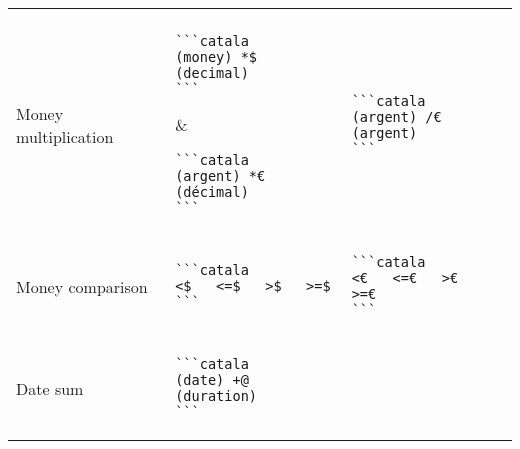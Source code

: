 \documentclass[a3paper,landscape]{article}
\begin{document}
\begin{multicols*}{2}
\begin{center}
\begin{tabular}{p{}p{}p{}}
      \vspace*{-1.75em}
      \\
      Money multiplication            &
      \vspace*{-1.75em}
      \begin{verbatim}
```catala
(money) *$ (decimal)
```
\end{verbatim}
      \vspace*{-1.75em}
                                      &
      \vspace*{-1.75em}
      \begin{verbatim}
```catala
(argent) *€ (décimal)
```
\end{verbatim}
      \vspace*{-1.75em}
      \\
      Money division                  &
      \vspace*{-1.75em}
      \begin{verbatim}
```catala
(money) /$ (money)
```
\end{verbatim}
      \vspace*{-1.75em}
                                      &
      \vspace*{-1.75em}
      \begin{verbatim}
```catala
(argent) /€ (argent)
```
\end{verbatim}
      \vspace*{-1.75em}
      \\
      Money comparison                &
      \vspace*{-1.75em}
      \begin{verbatim}
```catala
<$   <=$   >$   >=$
```
\end{verbatim}
      \vspace*{-1.75em}
                                      &
      \vspace*{-1.75em}
      \begin{verbatim}
```catala
<€   <=€   >€   >=€
```
\end{verbatim}
      \vspace*{-1.75em}
      \\
      Date sum                        &
      \vspace*{-1.75em}
      \begin{verbatim}
```catala
(date) +@ (duration)
```
\end{verbatim}
      \vspace*{-1.75em}
                                      &
      \vspace*{-1.75em}

\end{tabular}
\end{center}
\end{multicols*}
\end{document}
